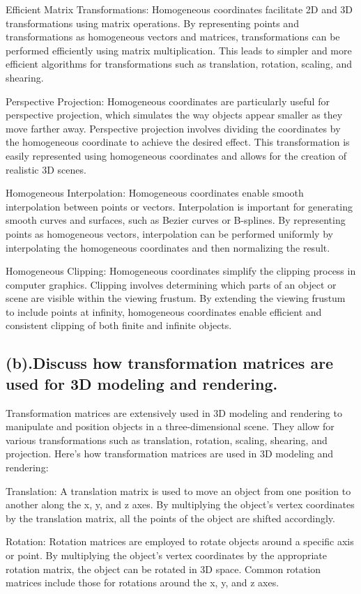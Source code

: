 \documentclass{article}
\begin{document}
\begin{itemize}
Efficient Matrix Transformations: Homogeneous coordinates facilitate 2D and 3D transformations using matrix operations. By representing points and transformations as homogeneous vectors and matrices, transformations can be performed efficiently using matrix multiplication. This leads to simpler and more efficient algorithms for transformations such as translation, rotation, scaling, and shearing.

Perspective Projection: Homogeneous coordinates are particularly useful for perspective projection, which simulates the way objects appear smaller as they move farther away. Perspective projection involves dividing the coordinates by the homogeneous coordinate to achieve the desired effect. This transformation is easily represented using homogeneous coordinates and allows for the creation of realistic 3D scenes.

Homogeneous Interpolation: Homogeneous coordinates enable smooth interpolation between points or vectors. Interpolation is important for generating smooth curves and surfaces, such as Bezier curves or B-splines. By representing points as homogeneous vectors, interpolation can be performed uniformly by interpolating the homogeneous coordinates and then normalizing the result.

Homogeneous Clipping: Homogeneous coordinates simplify the clipping process in computer graphics. Clipping involves determining which parts of an object or scene are visible within the viewing frustum. By extending the viewing frustum to include points at infinity, homogeneous coordinates enable efficient and consistent clipping of both finite and infinite objects.
\subsection{(b).Discuss how transformation matrices are used for 3D modeling and rendering.}
Transformation matrices are extensively used in 3D modeling and rendering to manipulate and position objects in a three-dimensional scene. They allow for various transformations such as translation, rotation, scaling, shearing, and projection. Here's how transformation matrices are used in 3D modeling and rendering:

Translation: A translation matrix is used to move an object from one position to another along the x, y, and z axes. By multiplying the object's vertex coordinates by the translation matrix, all the points of the object are shifted accordingly.

Rotation: Rotation matrices are employed to rotate objects around a specific axis or point. By multiplying the object's vertex coordinates by the appropriate rotation matrix, the object can be rotated in 3D space. Common rotation matrices include those for rotations around the x, y, and z axes.


\end{itemize}
\end{document}
